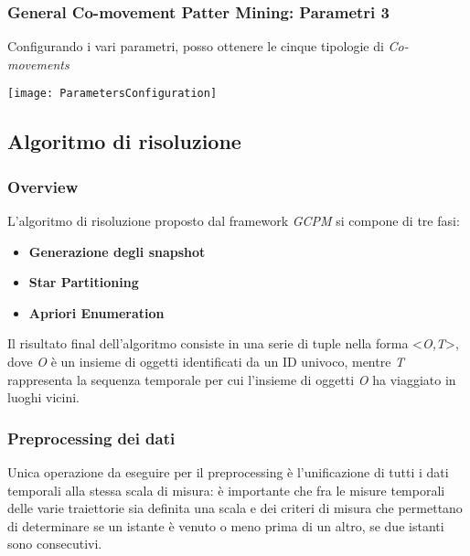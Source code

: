 \documentclass{beamer}
\begin{document}
\begin{frame}
\frametitle{General Co-movement Patter Mining: Parametri 3}

Configurando i vari parametri, posso ottenere le cinque tipologie di \textit{Co-movements}

\begin{center}
\texttt{[image: ParametersConfiguration]} 
\end{center}

\end{frame}



\subsection{Algoritmo di risoluzione}

\begin{frame}
	
	\frametitle{Overview}
	
	L'algoritmo di risoluzione proposto dal framework \textit{GCPM} si compone di tre fasi:
	
	\begin{itemize}
		
		\item \textbf{Generazione degli snapshot}
		
		\item \textbf{Star Partitioning}
		
		\item \textbf{Apriori Enumeration}
	\end{itemize}

Il risultato final dell'algoritmo consiste in una serie di tuple nella forma  \textless \textit{O,T}\textgreater,  dove \textit{O} è un insieme di oggetti identificati da un ID univoco, 
mentre \textit{T} rappresenta la sequenza temporale per cui l'insieme di oggetti \textit{O} ha viaggiato in luoghi vicini.
	
\end{frame}	

\begin{frame}
	\frametitle{Preprocessing dei dati}
	Unica operazione da eseguire per il preprocessing è l'unificazione di tutti i dati temporali alla stessa scala di misura:
	è importante che fra le misure temporali delle varie traiettorie sia definita una scala e dei criteri di misura che permettano di determinare se un istante è venuto o meno prima di un altro, 
	se due istanti sono consecutivi.
\end{frame}
\end{document}
